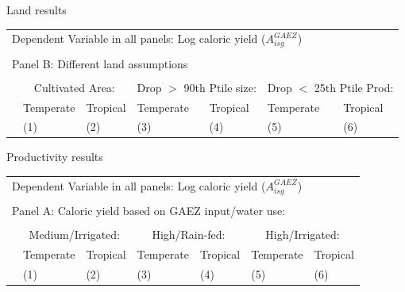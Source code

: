 \documentclass[10pt, xcolor=dvipsnames]{beamer}
\begin{document}
\begin{frame}{Land results}\label{landreg}
{\footnotesize
\begin{tabularx}{\textwidth}{lXXXXXX}
\midrule
\multicolumn{7}{l}{Dependent Variable in all panels: Log caloric yield ($A^{GAEZ}_{isg}$)} \\ \\
\multicolumn{7}{l}{Panel B: Different land assumptions} \\ \\
 & \multicolumn{2}{c}{Cultivated Area:} & \multicolumn{2}{c}{Drop $>$ 90th Ptile size:} & \multicolumn{2}{c}{Drop $<$ 25th Ptile Prod:}\\ \cmidrule(lr){2-3} \cmidrule(lr){4-5} \cmidrule(lr){6-7}
 & Temperate & Tropical & Temperate  & Tropical  & Temperate  & Tropical \\
 & (1) & (2) & (3) & (4) & (5) & (6) \\
\midrule

\midrule
\end{tabularx}
}

\hfill \hyperlink{land}{}
\end{frame}


\begin{frame}{Productivity results}\label{prodreg}
{\footnotesize
\begin{tabularx}{\textwidth}{lXXXXXX}
\midrule
\multicolumn{7}{l}{Dependent Variable in all panels: Log caloric yield ($A^{GAEZ}_{isg}$)} \\ \\
\multicolumn{7}{l}{Panel A: Caloric yield based on GAEZ input/water use:} \\ \\
 & \multicolumn{2}{c}{Medium/Irrigated:} & \multicolumn{2}{c}{High/Rain-fed:} & \multicolumn{2}{c}{High/Irrigated:}\\ \cmidrule(lr){2-3} \cmidrule(lr){4-5} \cmidrule(lr){6-7} 
 & Temperate & Tropical & Temperate  & Tropical  & Temperate  & Tropical \\
 & (1) & (2) & (3) & (4) & (5) & (6) \\
\midrule

\midrule
\end{tabularx}
}

\hfill \hyperlink{prod}{}
\end{frame}
\end{document}
